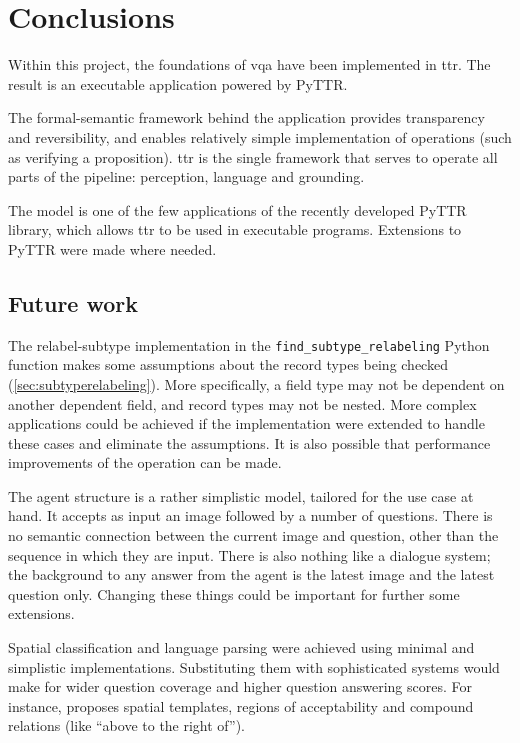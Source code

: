 \renewcommand{\sectionautorefname}{Section}
\let\subsectionautorefname\sectionautorefname
\let\subsubsectionautorefname\sectionautorefname
\glsresetall
\section{Conclusions}
\label{sec:conclusions}

Within this project, the foundations of \gls{vqa} have been implemented in \gls{ttr}.
The result is an executable application powered by PyTTR.

The formal-semantic framework behind the application provides transparency and reversibility, and enables relatively simple implementation of operations (such as verifying a proposition).
\Gls{ttr} is the single framework that serves to operate all parts of the pipeline: perception, language and grounding.

The model is one of the few applications of the recently developed PyTTR library, which allows \gls{ttr} to be used in executable programs.
Extensions to PyTTR were made where needed.



\subsection{Future work}

The relabel-subtype implementation in the \texttt{find\_subtype\_relabeling} Python function makes some assumptions about the record types being checked (\autoref{sec:subtyperelabeling}).
More specifically, a field type may not be dependent on another dependent field, and record types may not be nested.
More complex applications could be achieved if the implementation were extended to handle these cases and eliminate the assumptions.
It is also possible that performance improvements of the operation can be made.

The agent structure is a rather simplistic model, tailored for the use case at hand.
It accepts as input an image followed by a number of questions.
There is no semantic connection between the current image and question, other than the sequence in which they are input.
There is also nothing like a dialogue system;
the background to any answer from the agent is the latest image and the latest question only.
Changing these things could be important for further some extensions.

Spatial classification and language parsing were achieved using minimal and simplistic implementations.
Substituting them with sophisticated systems would make for wider question coverage and higher question answering scores.
For instance, \cite{LoganComputationalAnalysisApprehension1996} proposes spatial templates, regions of acceptability and compound relations (like ``above to the right of'').

